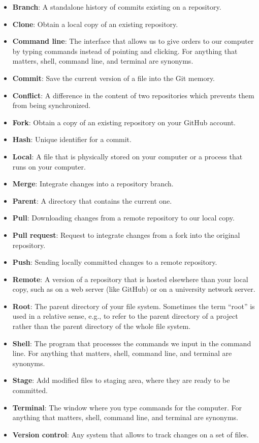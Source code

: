 \documentclass[
]{book}
\providecommand{\tightlist}{%
  \setlength{\itemsep}{0pt}\setlength{\parskip}{0pt}}
\begin{document}
\begin{itemize}
\tightlist
\item
  \textbf{Branch}: A standalone history of commits existing on a repository.
\item
  \textbf{Clone}: Obtain a local copy of an existing repository.
\item
  \textbf{Command line}: The interface that allows us to give orders to our computer by typing commands instead of pointing and clicking. For anything that matters, shell, command line, and terminal are synonyms.
\item
  \textbf{Commit}: Save the current version of a file into the Git memory.
\item
  \textbf{Conflict}: A difference in the content of two repositories which prevents them from being synchronized.
\item
  \textbf{Fork}: Obtain a copy of an existing repository on your GitHub account.
\item
  \textbf{Hash}: Unique identifier for a commit.
\item
  \textbf{Local}: A file that is physically stored on your computer or a process that runs on your computer.
\item
  \textbf{Merge}: Integrate changes into a repository branch.
\item
  \textbf{Parent}: A directory that contains the current one.
\item
  \textbf{Pull}: Downloading changes from a remote repository to our local copy.
\item
  \textbf{Pull request}: Request to integrate changes from a fork into the original repository.
\item
  \textbf{Push}: Sending locally committed changes to a remote repository.
\item
  \textbf{Remote}: A version of a repository that is hosted elsewhere than your local copy, such as on a web server (like GitHub) or on a university network server.
\item
  \textbf{Root}: The parent directory of your file system. Sometimes the term ``root'' is used in a relative sense, e.g., to refer to the parent directory of a project rather than the parent directory of the whole file system.
\item
  \textbf{Shell}: The program that processes the commands we input in the command line. For anything that matters, shell, command line, and terminal are synonyms.
\item
  \textbf{Stage}: Add modified files to staging area, where they are ready to be committed.
\item
  \textbf{Terminal}: The window where you type commands for the computer. For anything that matters, shell, command line, and terminal are synonyms.
\item
  \textbf{Version control}: Any system that allows to track changes on a set of files.
\end{itemize}

  
\end{document}
